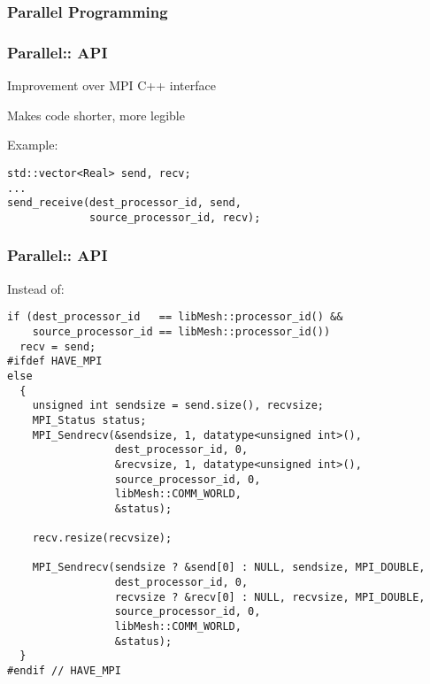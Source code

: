 

\subsubsection{Parallel Programming}
\begin{frame}[fragile]
\frametitle{Parallel:: API}
\item Improvement over MPI C++ interface
\item Makes code shorter, more legible
\royitemizeend

Example:
\small
\begin{lstlisting}
std::vector<Real> send, recv;
...
send_receive(dest_processor_id, send,
             source_processor_id, recv);
\end{lstlisting}
\end{frame}



\begin{frame}
\frametitle{Parallel:: API}

Instead of:
\begin{lstlisting}
if (dest_processor_id   == libMesh::processor_id() &&
    source_processor_id == libMesh::processor_id())
  recv = send;
#ifdef HAVE_MPI
else
  {
    unsigned int sendsize = send.size(), recvsize;
    MPI_Status status;
    MPI_Sendrecv(&sendsize, 1, datatype<unsigned int>(),
                 dest_processor_id, 0,
                 &recvsize, 1, datatype<unsigned int>(),
                 source_processor_id, 0,
                 libMesh::COMM_WORLD,
                 &status);

    recv.resize(recvsize);

    MPI_Sendrecv(sendsize ? &send[0] : NULL, sendsize, MPI_DOUBLE,
                 dest_processor_id, 0,
                 recvsize ? &recv[0] : NULL, recvsize, MPI_DOUBLE,
                 source_processor_id, 0,
                 libMesh::COMM_WORLD,
                 &status);
  }
#endif // HAVE_MPI
\end{lstlisting}
\end{frame}

